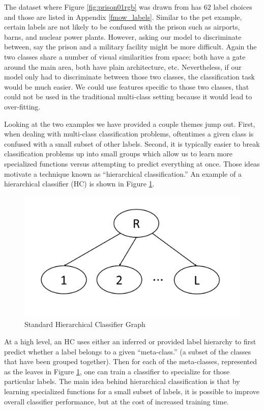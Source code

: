 \documentclass[draft, ../thesis.tex]{subfiles}
\begin{document}
    The dataset where Figure \ref{fig:prison01rgb} was drawn from has $62$ label choices and those are listed in Appendix \ref{fmow_labels}. Similar to the pet example, certain labels are not likely to be confused with the prison such as airports, barns, and nuclear power plants. However, asking our model to discriminate between, say the prison and a military facility might be more difficult. Again the two classes share a number of visual similarities from space; both have a gate around the main area, both have plain architecture, etc. Nevertheless, if our model only had to discriminate between those two classes, the classification task would be much easier. We could use features specific to those two classes, that could not be used in the traditional multi-class setting because it would lead to over-fitting. 
    
    Looking at the two examples we have provided a couple themes jump out. First, when dealing with multi-class classification problems, oftentimes a given class is confused with a small subset of other labels. Second, it is typically easier to break classification problems up into small groups which allow us to learn more specialized functions versus attempting to predict everything at once. Those ideas motivate a technique known as ``hierarchical classification.'' An example of a hierarchical classifier (HC) is shown in Figure \ref{fig:hierarchicalclassifier}.
    
    \begin{figure}
    	\centering
    	\includegraphics[width=0.7\linewidth]{images/hierarchical_classifier}
    	\caption{Standard Hierarchical Classifier Graph}
    	\label{fig:hierarchicalclassifier}
    \end{figure}
    
    At a high level, an HC uses either an inferred or provided label hierarchy to first predict whether a label belongs to a given ``meta-class.'' (a subset of the classes that have been grouped together). Then for each of the meta-classes, represented as the leaves in Figure \ref{fig:hierarchicalclassifier}, one can train a classifier to specialize for those particular labels. The main idea behind hierarchical classification is that by learning specialized functions for a small subset of labels, it is possible to improve overall classifier performance, but at the cost of increased training time. 
    
\end{document}
